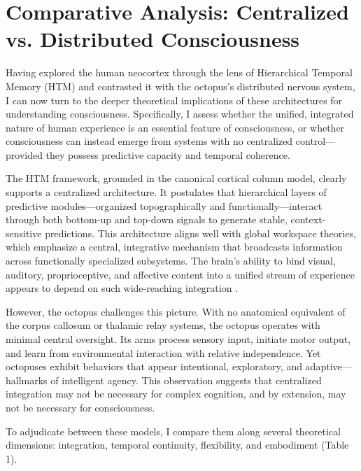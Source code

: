 \documentclass{article}
\begin{document}
\section{Comparative Analysis: Centralized vs. Distributed Consciousness}

Having explored the human neocortex through the lens of Hierarchical Temporal Memory (HTM) and contrasted it with the octopus's distributed nervous system, I can now turn to the deeper theoretical implications of these architectures for understanding consciousness. Specifically, I assess whether the unified, integrated nature of human experience is an essential feature of consciousness, or whether consciousness can instead emerge from systems with no centralized control—provided they possess predictive capacity and temporal coherence.

The HTM framework, grounded in the canonical cortical column model, clearly supports a centralized architecture. It postulates that hierarchical layers of predictive modules—organized topographically and functionally—interact through both bottom-up and top-down signals to generate stable, context-sensitive predictions. This architecture aligns well with global workspace theories, which emphasize a central, integrative mechanism that broadcasts information across functionally specialized subsystems. The brain’s ability to bind visual, auditory, proprioceptive, and affective content into a unified stream of experience appears to depend on such wide-reaching integration \parencite{mountcastle1997columnar, clark2016surfing}.

However, the octopus challenges this picture. With no anatomical equivalent of the corpus callosum or thalamic relay systems, the octopus operates with minimal central oversight. Its arms process sensory input, initiate motor output, and learn from environmental interaction with relative independence. Yet octopuses exhibit behaviors that appear intentional, exploratory, and adaptive—hallmarks of intelligent agency. This observation suggests that centralized integration may not be necessary for complex cognition, and by extension, may not be necessary for consciousness.

To adjudicate between these models, I compare them along several theoretical dimensions: integration, temporal continuity, flexibility, and embodiment (Table 1).
\end{document}
